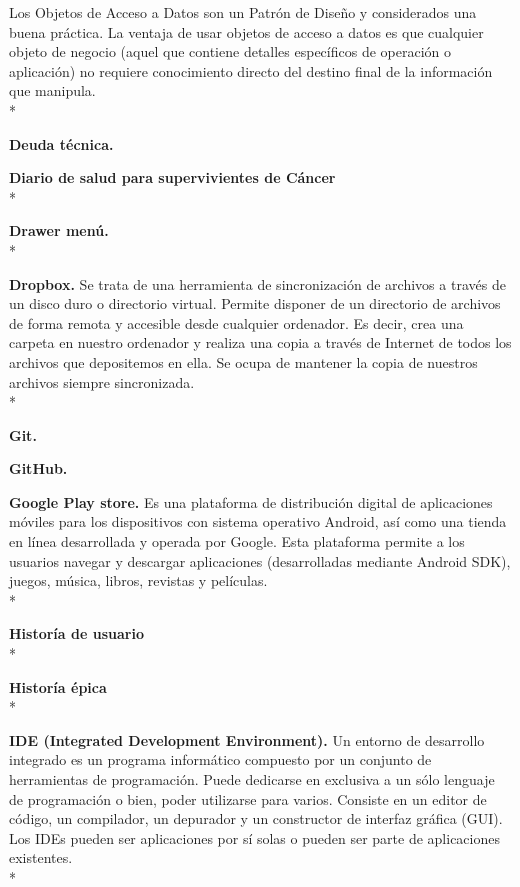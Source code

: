 \documentclass[../pfc.tex]{subfiles}
\begin{document}
	Los Objetos de Acceso a Datos son un Patrón de Diseño y considerados una buena práctica.
	La ventaja de usar objetos de acceso a datos es que cualquier objeto de negocio (aquel que contiene
	detalles específicos de operación o aplicación) no requiere conocimiento directo del destino final de
	la información que manipula.\\*
	
	\textbf{Deuda técnica.}
	
	\textbf{Diario de salud para supervivientes de Cáncer}\\*
	
	\textbf{Drawer menú.}\\*
	
	\textbf{Dropbox.}
	Se trata de una herramienta de sincronización de archivos a través de un disco duro o
	directorio virtual. Permite disponer de un directorio de archivos de forma remota y accesible desde
	cualquier ordenador. Es decir, crea una carpeta en nuestro ordenador y realiza una copia a través
	de Internet de todos los archivos que depositemos en ella. Se ocupa de mantener la copia de
	nuestros archivos siempre sincronizada.\\*
	
	\textbf{Git.}

	\textbf{GitHub.}
	
	\textbf{Google Play store.}
	Es una plataforma de distribución digital de aplicaciones móviles para los dispositivos con sistema operativo Android, así como una tienda en línea desarrollada y operada por Google. Esta plataforma permite a los usuarios navegar y descargar aplicaciones (desarrolladas mediante Android SDK), juegos, música, libros, revistas y películas.\\*
	
	\textbf{Historía de usuario}\\*
		
	\textbf{Historía épica}\\*
		
	\textbf{IDE (Integrated Development Environment).}
	Un entorno de desarrollo integrado es un programa
	informático compuesto por un conjunto de herramientas de programación. Puede dedicarse en
	exclusiva a un sólo lenguaje de programación o bien, poder utilizarse para varios. Consiste en un
	editor de código, un compilador, un depurador y un constructor de interfaz gráfica (GUI). Los IDEs
	pueden ser aplicaciones por sí solas o pueden ser parte de aplicaciones existentes.\\*
	
\end{document}
